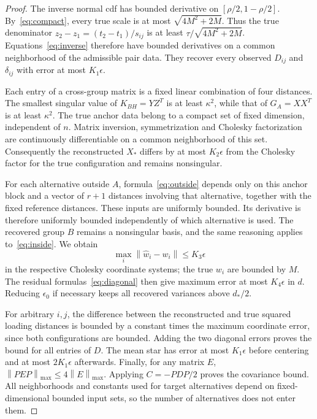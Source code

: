 \documentclass[11pt]{amsart}
\theoremstyle{definition}\newtheorem{example}[theorem]{Example}
\theoremstyle{remark}\newtheorem{remark}[theorem]{Remark}
\newcommand{\norm}[1]{\left\lVert#1\right\rVert}
\begin{document}
\begin{proof}
The inverse normal cdf has bounded derivative on $[\rho/2,1-\rho/2]$. By~\eqref{eq:compact}, every true scale is at most $\sqrt{4M^2+2M}$. Thus the true denominator $z_2-z_1=(t_2-t_1)/s_{ij}$ is at least $\tau/\sqrt{4M^2+2M}$. Equations~\eqref{eq:inverse} therefore have bounded derivatives on a common neighborhood of the admissible pair data. They recover every observed $D_{ij}$ and $\delta_{ij}$ with error at most $K_1\epsilon$.

Each entry of a cross-group matrix is a fixed linear combination of four distances. The smallest singular value of $K_{BH}=YZ^T$ is at least $\kappa^2$, while that of $G_A=XX^T$ is at least $\kappa^2$. The true anchor data belong to a compact set of fixed dimension, independent of $n$. Matrix inversion, symmetrization and Cholesky factorization are continuously differentiable on a common neighborhood of this set. Consequently the reconstructed $X_*$ differs by at most $K_2\epsilon$ from the Cholesky factor for the true configuration and remains nonsingular.

For each alternative outside $A$, formula~\eqref{eq:outside} depends only on this anchor block and a vector of $r+1$ distances involving that alternative, together with the fixed reference distances. These inputs are uniformly bounded. Its derivative is therefore uniformly bounded independently of which alternative is used. The recovered group $B$ remains a nonsingular basis, and the same reasoning applies to~\eqref{eq:inside}. We obtain
\[
 \max_i\norm{\widehat w_i-w_i}\leq K_3\epsilon
\]
in the respective Cholesky coordinate systems; the true $w_i$ are bounded by $M$. The residual formulas~\eqref{eq:diagonal} then give maximum error at most $K_4\epsilon$ in $d$. Reducing $\epsilon_0$ if necessary keeps all recovered variances above $d_*/2$.

For arbitrary $i,j$, the difference between the reconstructed and true squared loading distances is bounded by a constant times the maximum coordinate error, since both configurations are bounded. Adding the two diagonal errors proves the bound for all entries of $D$. The mean star has error at most $K_1\epsilon$ before centering and at most $2K_1\epsilon$ afterwards. Finally, for any matrix $E$, $\norm{PEP}_{\max}\leq4\norm E_{\max}$. Applying $C=-PDP/2$ proves the covariance bound. All neighborhoods and constants used for target alternatives depend on fixed-dimensional bounded input sets, so the number of alternatives does not enter them.
\end{proof}
\end{document}
